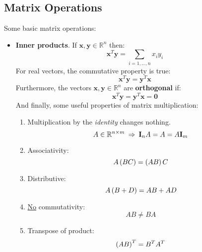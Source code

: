 \subsection{Matrix Operations}

Some basic matrix operations:
\begin{itemize}
	\item \textbf{Inner products}. If $\mathbf{x}, \mathbf{y} \in \mathbb{R}^{n}$ then:
	\begin{equation*}
		\mathbf{x}^{T} \mathbf{y} = \displaystyle\sum_{i = 1, \dots, n} x_{i}y_{i}
	\end{equation*}
	For real vectors, the commutative property is true:
	\begin{equation*}
		\mathbf{x}^{T} \mathbf{y} = \mathbf{y}^{T} \mathbf{x}
	\end{equation*}
	Furthermore, the vectors $\mathbf{x}, \mathbf{y} \in \mathbb{R}^{n}$ are \textbf{orthogonal} if:
	\begin{equation*}
		\mathbf{x}^{T} \mathbf{y} = \mathbf{y}^{T} \mathbf{x} = \mathbf{0}
	\end{equation*}
	And finally, some useful properties of matrix multiplication:
	\begin{enumerate}
		\item Multiplication by the \emph{identity} changes nothing.
		\begin{equation*}\index{Matrices Multiplication}
			A \in \mathbb{R}^{n \times m} \: \Rightarrow \: \mathbf{I}_{n} A = A = A\mathbf{I}_{m}
		\end{equation*}
		
		\item Associativity:
		\begin{equation*}\index{Matrix Associativity Property}
			A\left(BC\right) = \left(AB\right)C
		\end{equation*}
		
		\item Distributive:
		\begin{equation*}\index{Matrix Distributive Property}
			A\left(B+D\right) = AB + AD
		\end{equation*}
		
		\item \underline{No} commutativity:
		\begin{equation*}
			AB \ne BA
		\end{equation*}
		
		\item Transpose of product:
		\begin{equation*}\index{Transpose product between matrices}
			\left(AB\right)^{T} = B^{T} A^{T}
		\end{equation*}
	\end{enumerate}
	

\end{itemize}
